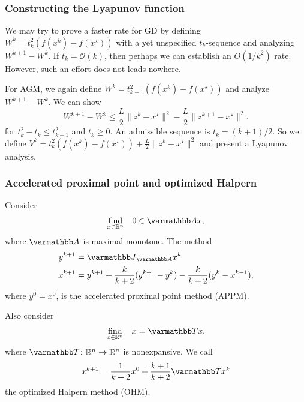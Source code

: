 \documentclass[10pt,mathserif]{beamer}
\begin{document}
\begin{frame}
\frametitle{Constructing the Lyapunov function}

We may try to prove a faster rate for GD by defining $W^k= t_k^2 (f(x^k) - f(x^\star))$ with a yet unspecified $t_k$-sequence and analyzing $W^{k+1}-W^k$.
If $t_k=\mathcal{O}(k)$, then perhaps we can establish an  $O(1/k^2)$ rate.
However, such an effort does not leads nowhere.

\vspace{0.2in}


For AGM, we again define $W^k= t_{k-1}^2 (f(x^k) - f(x^\star))$ and analyze $W^{k+1}-W^k$.
We can show
\[
W^{k+1}-W^k\le \frac{L}{2}\|z^k-x^\star\|^2-\frac{L}{2}\|z^{k+1}-x^\star\|^2.
\]
for $t_{k}^2-t_{k}\le t_{k-1}^2$ and $t_{k} \ge 0$. An admissible sequence is $t_k = (k+1)/2$.
So we define $V^k=t_k^2(f(x^k)-f(x^\star))+\frac{L}{2}\|z^k-x^\star\|^2$ and present a Lyapunov analysis.

\end{frame}

\begin{frame}
\frametitle{Accelerated proximal point and optimized Halpern}
Consider
\begin{align*}
\begin{array}{ll}
\underset{x\in \reals^n}{\mbox{find}}
  &0\in \opA x,
  \end{array}
\end{align*}
where $\opA$ is maximal monotone.
The method
\begin{align*}
y^{k+1}&=\opJ_{\opA}x^k\\
x^{k+1}&=y^{k+1}+\frac{k}{k+2}(y^{k+1}-y^k)-\frac{k}{k+2}(y^k-x^{k-1}),
\end{align*}
where $y^0=x^0$, is the accelerated proximal point method (APPM).
\vspace{0.2in}

Also consider 
\begin{align*}
\begin{array}{ll}
\underset{x\in \reals^n}{\mbox{find}}
  &x= \opT x,
  \end{array}
\end{align*}
where $\opT\colon\reals^n\rightarrow\reals^n$ is nonexpansive.
We call
\[
x^{k+1}=\frac{1}{k+2}x^0+\frac{k+1}{k+2}\opT x^k
\]
the optimized Halpern method (OHM).
\end{frame}
\end{document}
